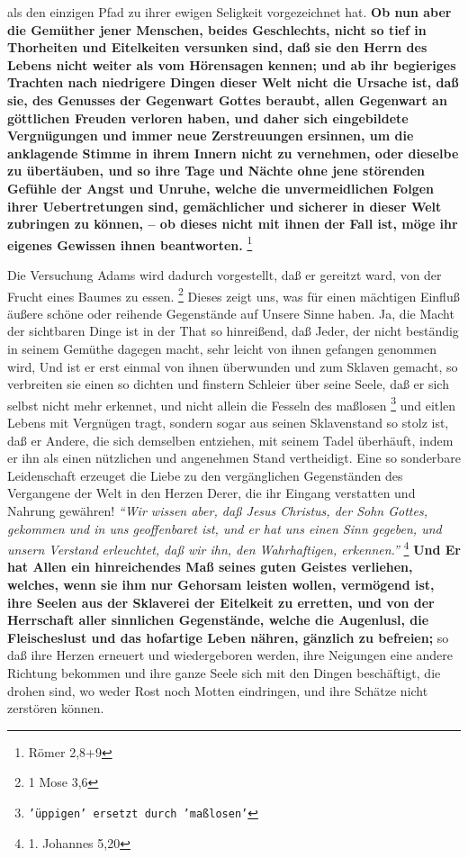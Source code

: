 {als den einzigen Pfad zu ihrer ewigen Seligkeit vorgezeichnet hat. \textbf{Ob
nun aber
die Gemüther jener Menschen, beides Geschlechts, nicht so tief in Thorheiten und
Eitelkeiten versunken sind, daß sie den Herrn des Lebens nicht weiter als vom
Hörensagen kennen; und ab ihr begieriges Trachten nach niedrigere Dingen dieser
Welt nicht die Ursache ist, daß sie, des Genusses der Gegenwart Gottes beraubt,
allen Gegenwart an göttlichen Freuden verloren haben, und daher sich
eingebildete Vergnügungen und immer neue Zerstreuungen ersinnen, um die
anklagende Stimme in ihrem Innern nicht zu vernehmen, oder dieselbe zu
übertäuben, und so ihre Tage und Nächte ohne jene störenden Gefühle der Angst
und Unruhe, welche die unvermeidlichen Folgen ihrer Uebertretungen sind,
gemächlicher und sicherer in dieser Welt zubringen zu können, -- ob dieses nicht
mit ihnen der Fall ist, möge ihr eigenes Gewissen ihnen
beantworten.}
\footnote{Römer 2,8+9}

\medskip

Die Versuchung Adams wird dadurch vorgestellt, daß er gereitzt ward, von der
Frucht eines Baumes zu essen.
\footnote{1 Mose 3,6}
Dieses zeigt uns, was für
einen mächtigen Einfluß äußere schöne oder reihende Gegenstände auf Unsere Sinne
haben. Ja, die Macht der sichtbaren Dinge ist in der That so hinreißend, daß
Jeder, der nicht beständig in seinem Gemüthe dagegen macht, sehr leicht von
ihnen gefangen genommen wird, Und ist er erst einmal von ihnen überwunden und
zum Sklaven gemacht, so verbreiten sie einen so dichten
und finstern Schleier
über seine Seele, daß er sich selbst nicht mehr erkennet, und nicht allein die
Fesseln des maßlosen
\footnote{\texttt{'üppigen' ersetzt durch 'maßlosen'}} und eitlen Lebens mit
Vergnügen tragt, sondern sogar aus
seinen Sklavenstand so stolz ist, daß er Andere, die sich
demselben entziehen,
mit seinem Tadel überhäuft, indem er ihn als einen nützlichen und angenehmen
Stand vertheidigt. Eine so sonderbare Leidenschaft erzeuget die Liebe zu den
vergänglichen Gegenständen des Vergangene der Welt in den Herzen Derer, die ihr
Eingang verstatten und Nahrung gewähren!
\textit{"`Wir wissen aber, daß Jesus Christus,
der Sohn Gottes, gekommen und in uns geoffenbaret ist, und er hat uns einen Sinn
gegeben, und unsern Verstand erleuchtet, daß wir ihn, den Wahrhaftigen,
erkennen."'}
\footnote{1. Johannes 5,20}
\textbf{Und Er hat Allen ein hinreichendes Maß seines
guten Geistes verliehen, welches, wenn sie ihm nur Gehorsam leisten wollen,
vermögend ist, ihre Seelen aus der Sklaverei der Eitelkeit zu erretten, und von
der Herrschaft aller sinnlichen Gegenstände, welche die Augenlusl, die
Fleischeslust und das hofartige Leben nähren, gänzlich zu befreien;} so daß ihre
Herzen erneuert und wiedergeboren werden, ihre Neigungen
eine andere Richtung
bekommen und ihre ganze Seele sich mit den Dingen beschäftigt, die drohen sind,
wo weder Rost noch Motten eindringen, und ihre Schätze nicht zerstören können.

}
